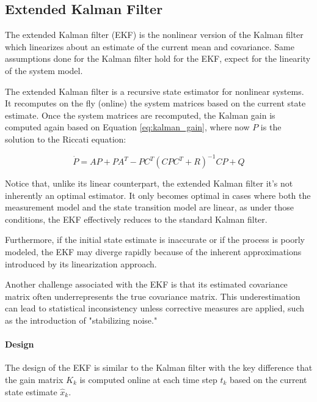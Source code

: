 \subsection{Extended Kalman Filter}
\label{subsec:extended_kalman_filter}

The extended Kalman filter (EKF) is the nonlinear version of the Kalman filter which linearizes about an estimate of the current mean and covariance.
Same assumptions done for the Kalman filter hold for the EKF, expect for the linearity of the system model.

The extended Kalman filter is a recursive state estimator for nonlinear systems.
It recomputes on the fly (online) the system matrices based on the current state estimate.
Once the system matrices are recomputed, the Kalman gain is computed again based on Equation \ref{eq:kalman_gain}, where now $P$ is the solution to the Riccati equation:

\begin{equation}
    \dot{P} = A P + P A^T - P C^T (C P C^T + R)^{-1} C P + Q
    \label{eq:riccati_equation}
\end{equation}

Notice that, unlike its linear counterpart, the extended Kalman filter it's not inherently an optimal estimator.
It only becomes optimal in cases where both the measurement model and the state transition model are linear, as under those conditions, the EKF effectively reduces to the standard Kalman filter.

Furthermore, if the initial state estimate is inaccurate or if the process is poorly modeled, the EKF may diverge rapidly because of the inherent approximations introduced by its linearization approach.

Another challenge associated with the EKF is that its estimated covariance matrix often underrepresents the true covariance matrix.
This underestimation can lead to statistical inconsistency unless corrective measures are applied, such as the introduction of "stabilizing noise."

\paragraph{Design}

The design of the EKF is similar to the Kalman filter with the key difference that the gain matrix $K_k$ is computed online at each time step $t_k$ based on the current state estimate $\hat{x}_k$.
